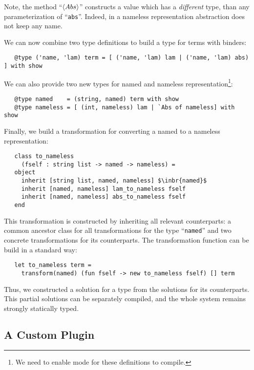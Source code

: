Note, the method ``$\left<Abs\right>$'' constructs a value which has a \emph{different} type, than any parameterization of ``\lstinline{abs}''. Indeed, in a
nameless representation abstraction does not keep any name.

We can now combine two type definitions to build a type for terms with binders:

\begin{lstlisting}
   @type ('name, 'lam) term = [ ('name, 'lam) lam | ('name, 'lam) abs) ] with show
\end{lstlisting}

We can also provide two new types for named and nameless representation\footnote{We need to enable  mode for these definitions to compile.}:

\begin{lstlisting}
   @type named    = (string, named) term with show
   @type nameless = [ (int, nameless) lam | `Abs of nameless] with show
\end{lstlisting}

Finally, we build a transformation for converting a named to a nameless representation:

\begin{lstlisting}
   class to_nameless
     (fself : string list -> named -> nameless) =
   object
     inherit [string list, named, nameless] $\inbr{named}$
     inherit [named, nameless] lam_to_nameless fself
     inherit [named, nameless] abs_to_nameless fself
   end
\end{lstlisting}

This transformation is constructed by inheriting all relevant counterparts: a common ancestor class for all transformations for the type ``\lstinline{named}'' and
two concrete transformations for its counterparts. The transformation function can be build in a standard way:

\begin{lstlisting}
   let to_nameless term =
     transform(named) (fun fself -> new to_nameless fself) [] term
\end{lstlisting}

Thus, we constructed a solution for a type from the solutions for its counterparts. This partial solutions can be separately compiled, and the whole
system remains strongly statically typed.

\subsection{A Custom Plugin}
\label{pluginExample}

